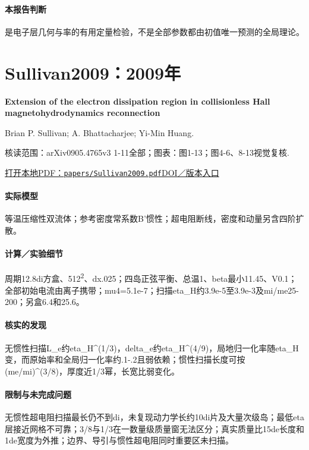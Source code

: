 \paragraph{本报告判断}是电子层几何与率的有用定量检验，不是全部参数都由初值唯一预测的全局理论。

\section{Sullivan2009：2009年}\label{paper:Sullivan2009}

\textbf{Extension of the electron dissipation region in collisionless Hall magnetohydrodynamics reconnection}\citep{Sullivan2009}\

Brian P. Sullivan;  A. Bhattacharjee;  Yi-Min Huang.

\textsf{核读范围：}arXiv0905.4765v3 1-11全部；\textsf{图表：}图1-13；图4-6、8-13视觉复核.

\href{run:papers/Sullivan2009.pdf}{打开本地PDF：\texttt{papers/Sullivan2009.pdf}}\quad\href{https://doi.org/10.1063/1.3251423}{DOI／版本入口}

\paragraph{实际模型}等温压缩性双流体；参考密度常系数B'惯性；超电阻断线，密度和动量另含四阶扩散。

\paragraph{计算／实验细节}周期12.8di方盒、512\textsuperscript{2}、dx.025；四岛正弦平衡、总温1、beta最小11.45、V0.1；全部初始电流由离子携带；mu4=5.1e-7；扫描eta\_H约3.9e-5至3.9e-3及mi/me25-200；另盒6.4和25.6。

\paragraph{核实的发现}无惯性扫描L\_e约eta\_H\textasciicircum{}(1/3)，delta\_e约eta\_H\textasciicircum{}(4/9)，局地归一化率随eta\_H变，而原始率和全局归一化率约.1-.2且弱依赖；惯性扫描长度可按(me/mi)\textasciicircum{}(3/8)，厚度近1/3幂，长宽比弱变化。

\paragraph{限制与未完成问题}无惯性超电阻扫描最长仍不到di，未复现动力学长约10di片及大量次级岛；最低eta层接近网格不可靠；3/8与1/3在一数量级质量窗无法区分；真实质量比15de长度和1de宽度为外推；边界、导引与惯性超电阻同时重要区未扫描。

